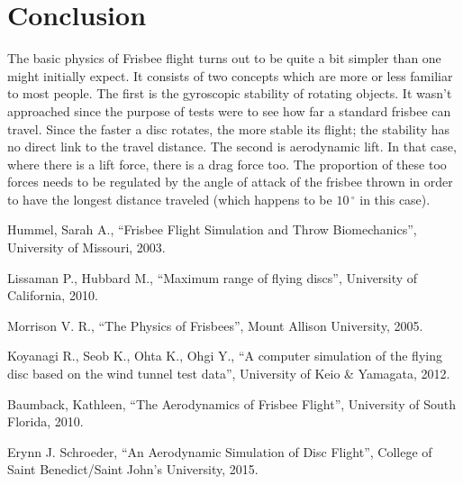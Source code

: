 \documentclass[10pt,a4paper]{report}
\begin{document}
\section{Conclusion}
The basic physics of Frisbee flight turns out to be quite a bit simpler than one might initially expect. It consists of two concepts which are more or less familiar to most people. The first is the gyroscopic stability of rotating objects. It wasn't approached since the purpose of tests were to see how far a standard frisbee can travel. Since the faster a disc rotates,
the more stable its flight; the stability has no direct link to the travel distance. The second is aerodynamic lift. In that case, where there is a lift force, there is a drag force too. The proportion of these too forces needs to be regulated by the angle of attack of the frisbee thrown in order to have the longest distance traveled (which happens to be $10\,^{\circ}$ in this case).

\begin{thebibliography}{9}

  Hummel, Sarah A.,
  “Frisbee Flight Simulation and Throw Biomechanics”,
  University of Missouri,
  2003.
  
  Lissaman P., Hubbard M.,
  “Maximum range of flying discs”,
  University of California,
  2010.
  
  Morrison V. R.,
  “The Physics of Frisbees”,
  Mount Allison University,
  2005.

  Koyanagi R., Seob K., Ohta K., Ohgi Y.,
  “A computer simulation of the flying disc based on the wind tunnel test data”,
  University of Keio \& Yamagata,
  2012.
  
  Baumback, Kathleen,
  “The Aerodynamics of Frisbee Flight”,
  University of South Florida,
  2010.
  
  Erynn J. Schroeder,
  “An Aerodynamic Simulation of Disc Flight”,
  College of Saint Benedict/Saint John's University,
  2015.

\end{thebibliography}
\end{document}
